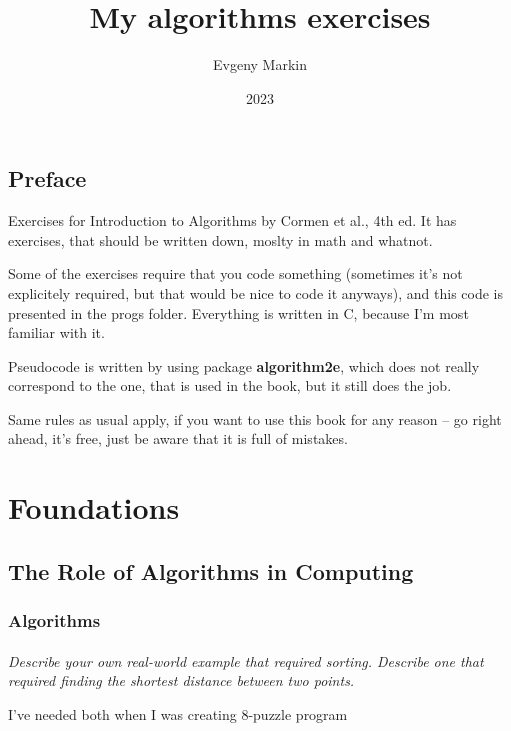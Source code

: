\documentclass[11pt,oneside,titlepage]{book}
\title{My algorithms exercises}
\author{Evgeny Markin}
\date{2023}
\begin{document}
\maketitle
\tableofcontents

\chapter*{Preface}
Exercises for Introduction to Algorithms by Cormen et al., 4th ed. It has
exercises, that should be written down, moslty in math and whatnot.

Some of the exercises require that you code something (sometimes it's not
explicitely required, but that would be nice to code it anyways), and this
code is presented in the progs folder. Everything is written in C, because I'm most
familiar with it. 

Pseudocode is written by using package \textbf{algorithm2e}, which does not really correspond
to the one, that is used in the book, but it still does the job.

Same rules as usual apply, if you want to use this book for any reason -- go right ahead, it's
free, just be aware that it is full of mistakes.

\part{Foundations}

\chapter{The Role of Algorithms in Computing}

\section{Algorithms}

\subsection{}

\textit{Describe your own real-world example that required sorting. Describe one
  that required finding the shortest distance between two points.}

I've needed both when I was creating 8-puzzle program

\subsection{}
\end{document}
